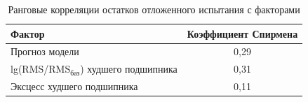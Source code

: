 \begin{table}[H]
\centering
\caption{Ранговые корреляции остатков отложенного испытания с факторами}\label{tab:resid}
\begin{tabular}{p{8.5cm}c}
\toprule
Фактор & Коэффициент Спирмена \\
\midrule
Прогноз модели & 0,29 \\
lg(RMS/RMS$_{\text{баз}}$) худшего подшипника & \textminus{}0,31 \\
Эксцесс худшего подшипника & 0,11 \\
\bottomrule
\end{tabular}
\end{table}